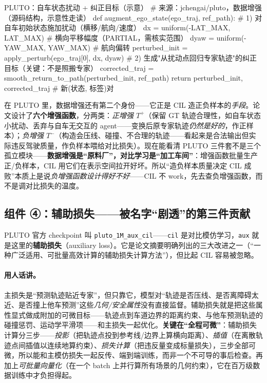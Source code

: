 \begin{codebox}[Python]{PLUTO：自车状态扰动 + 纠正目标（示意）}
# 来源：jchengai/pluto，数据增强（源码结构，示意性走读）
def augment_ego_state(ego_traj, ref_path):
    # 1) 对自车初始状态施加扰动（横移/航向/速度）
    dx = uniform(-LAT_MAX, LAT_MAX)        # 横向平移幅度（PARTIAL，需核实范围）
    dyaw = uniform(-YAW_MAX, YAW_MAX)      # 航向偏转
    perturbed_init = apply_perturb(ego_traj[0], dx, dyaw)
    # 2) 生成"从扰动点回归专家轨迹"的纠正目标（关键：不是照搬专家）
    corrected_traj = smooth_return_to_path(perturbed_init, ref_path)
    return perturbed_init, corrected_traj  # 新(状态, 标签)对
\end{codebox}

\begin{insight}
在 PLUTO 里，数据增强还有第二个身份——它正是 CIL 造正负样本的\emph{手段}。论文设计了\textbf{六个增强函数}，分两类：\emph{正增强 $T^+$}（保留 GT 轨迹合理性，如自车状态小扰动、丢弃与自车无交互的 agent——变换后原专家轨迹\emph{仍然是好的}，作正样本）；\emph{负增强 $T^-$}（构造会压线、碰撞、不合理的轨迹——看起来是合法输出但实际违反驾驶质量，作负样本喂给对比损失）。现在能看清 PLUTO 三件套不是三个孤立模块——\textbf{数据增强是“原料厂”，对比学习是“加工车间”}：增强函数批量生产正/负样本，CIL 用它们在表示空间拉开好坏。所以“造负样本质量决定 CIL 成败”本质上是说\emph{负增强函数设计得好不好}——CIL 不 work，先去查负增强函数，而不是调对比损失的温度。
\end{insight}

\subsection{组件 ④：辅助损失——被名字“剧透”的第三件贡献}
\label{sec:de-aux}

PLUTO 官方 checkpoint 叫 \texttt{pluto\_1M\_aux\_cil}——\texttt{cil} 是对比模仿学习，\texttt{aux} 就是这里的\textbf{辅助损失}（auxiliary loss）。它是论文摘要明确列出的三大改进之一（“一种广泛适用、可批量高效计算的辅助损失计算方法”），但比起 CIL 容易被忽略。

\paragraph{用人话讲。}
主损失是“预测轨迹贴近专家”，但只靠它，模型对“轨迹是否压线、是否离障碍太近、是否撞上他车预测”这些\emph{几何/安全属性}没有直接监督。辅助损失就是把这些属性显式做成附加的可微目标——轨迹点到车道边界的距离约束、与他车预测轨迹的碰撞惩罚、运动学平滑项——和主损失一起优化。\textbf{关键在“全程可微”}：辅助损失计算分三步——\emph{投影}（把轨迹点投到参考线/边界上算横向距离）、\emph{插值}（在离散轨迹点间插值以连续地算约束）、\emph{损失计算}（把违反量变成标量损失），三步全部可微，所以能和主模仿损失一起反传、端到端训练，而非一个不可导的事后检查。再加上\emph{可批量向量化}（在一个 batch 上并行算所有场景的几何约束），它在百万级数据训练中才负担得起。

